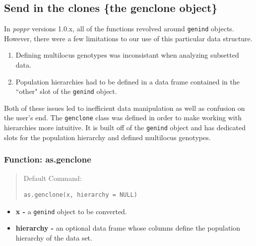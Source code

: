 \documentclass[letterpaper]{article}\usepackage[]{graphicx}\usepackage[]{color}
\makeatletter
\newenvironment{kframe}{%
 \def\at@end@of@kframe{}%
 \ifinner\ifhmode%
  \def\at@end@of@kframe{\end{minipage}}%
  \begin{minipage}{\columnwidth}%
 \fi\fi%
 \def\FrameCommand##1{\hskip\@totalleftmargin \hskip-\fboxsep
 \colorbox{shadecolor}{##1}\hskip-\fboxsep
     \hskip-\linewidth \hskip-\@totalleftmargin \hskip\columnwidth}%
 \MakeFramed {\advance\hsize-\width
   \@totalleftmargin\z@ \linewidth\hsize
   \@setminipage}}%
 {\par\unskip\endMakeFramed%
 \at@end@of@kframe}
\newenvironment{knitrout}{}{} %
\newcommand{\poppr}{\textit{poppr}}
\makeatother
\begin{document}
%
\subsection{Send in the clones \{the genclone object\}}
\label{intro:genclone}

In \poppr{} versions 1.0.x, all of the functions revolved around
\texttt{genind} objects. However, there were a few limitations to our use of
this particular data structure.

\begin{enumerate}
  \item Defining multilocus genotypes was inconsistant when analyzing subsetted
        data.
  \item Population hierarchies had to be defined in a data frame contained in 
        the ``other" slot of the \texttt{genind} object. 
\end{enumerate}

Both of these issues led to inefficient data manipulation as well as confusion 
on the user's end. The \texttt{genclone} class was defined in order to make 
working with hierarchies more intuitive. It is built off of the 
\texttt{genind} object and has dedicated slots for the population hierarchy and
defined multilocus genotypes. 

\subsubsection{Function: as.genclone}
\label{intro:genclone:as.genclone}
\begin{quote}
Default Command:
\begin{knitrout}
\color{fgcolor}\begin{kframe}
\begin{verbatim}
as.genclone(x, hierarchy = NULL)
\end{verbatim}
\end{kframe}
\end{knitrout}

\end{quote}
\begin{itemize}
  \item \textbf{x -} a \texttt{genind} object to be converted.
  \item \textbf{hierarchy -} an optional data frame whose columns define the 
  population hierarchy of the data set.
\end{itemize}
\end{document}
